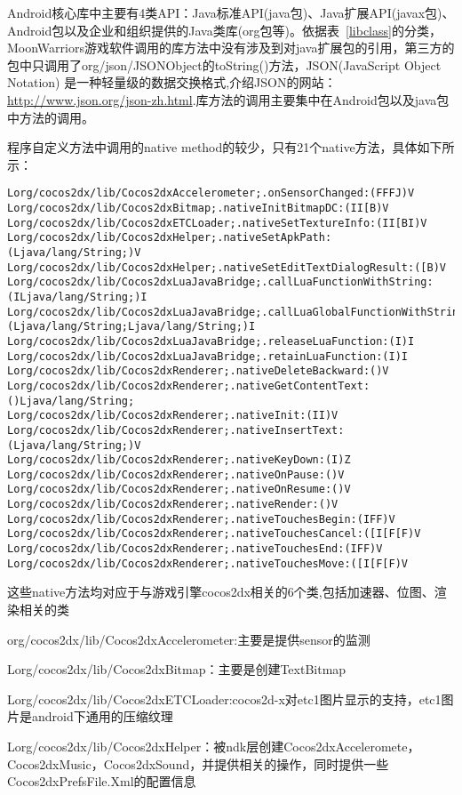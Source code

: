 \newpage

Android核心库中主要有4类API：Java标准API(java包)、Java扩展API(javax包)、Android包以及企业和组织提供的Java类库(org包等)。依据表~\ref{libclass}的分类，MoonWarriors游戏软件调用的库方法中没有涉及到对java扩展包的引用，第三方的包中只调用了org/json/JSONObject的toString()方法，JSON(JavaScript Object Notation) 是一种轻量级的数据交换格式,介绍JSON的网站：\url{http://www.json.org/json-zh.html}.库方法的调用主要集中在Android包以及java包中方法的调用。

程序自定义方法中调用的native method的较少，只有21个native方法，具体如下所示：
\begin{lstlisting}
Lorg/cocos2dx/lib/Cocos2dxAccelerometer;.onSensorChanged:(FFFJ)V
Lorg/cocos2dx/lib/Cocos2dxBitmap;.nativeInitBitmapDC:(II[B)V
Lorg/cocos2dx/lib/Cocos2dxETCLoader;.nativeSetTextureInfo:(II[BI)V
Lorg/cocos2dx/lib/Cocos2dxHelper;.nativeSetApkPath:(Ljava/lang/String;)V
Lorg/cocos2dx/lib/Cocos2dxHelper;.nativeSetEditTextDialogResult:([B)V
Lorg/cocos2dx/lib/Cocos2dxLuaJavaBridge;.callLuaFunctionWithString:(ILjava/lang/String;)I
Lorg/cocos2dx/lib/Cocos2dxLuaJavaBridge;.callLuaGlobalFunctionWithString:(Ljava/lang/String;Ljava/lang/String;)I
Lorg/cocos2dx/lib/Cocos2dxLuaJavaBridge;.releaseLuaFunction:(I)I
Lorg/cocos2dx/lib/Cocos2dxLuaJavaBridge;.retainLuaFunction:(I)I
Lorg/cocos2dx/lib/Cocos2dxRenderer;.nativeDeleteBackward:()V
Lorg/cocos2dx/lib/Cocos2dxRenderer;.nativeGetContentText:()Ljava/lang/String;
Lorg/cocos2dx/lib/Cocos2dxRenderer;.nativeInit:(II)V
Lorg/cocos2dx/lib/Cocos2dxRenderer;.nativeInsertText:(Ljava/lang/String;)V
Lorg/cocos2dx/lib/Cocos2dxRenderer;.nativeKeyDown:(I)Z
Lorg/cocos2dx/lib/Cocos2dxRenderer;.nativeOnPause:()V
Lorg/cocos2dx/lib/Cocos2dxRenderer;.nativeOnResume:()V
Lorg/cocos2dx/lib/Cocos2dxRenderer;.nativeRender:()V
Lorg/cocos2dx/lib/Cocos2dxRenderer;.nativeTouchesBegin:(IFF)V
Lorg/cocos2dx/lib/Cocos2dxRenderer;.nativeTouchesCancel:([I[F[F)V
Lorg/cocos2dx/lib/Cocos2dxRenderer;.nativeTouchesEnd:(IFF)V
Lorg/cocos2dx/lib/Cocos2dxRenderer;.nativeTouchesMove:([I[F[F)V
\end{lstlisting}
这些native方法均对应于与游戏引擎cocos2dx相关的6个类,包括加速器、位图、渲染相关的类

org/cocos2dx/lib/Cocos2dxAccelerometer:主要是提供sensor的监测

Lorg/cocos2dx/lib/Cocos2dxBitmap：主要是创建TextBitmap

Lorg/cocos2dx/lib/Cocos2dxETCLoader:cocos2d-x对etc1图片显示的支持，etc1图片是android下通用的压缩纹理

Lorg/cocos2dx/lib/Cocos2dxHelper：被ndk层创建Cocos2dxAcceleromete， Cocos2dxMusic，Cocos2dxSound，并提供相关的操作，同时提供一些Cocos2dxPrefsFile.Xml的配置信息

